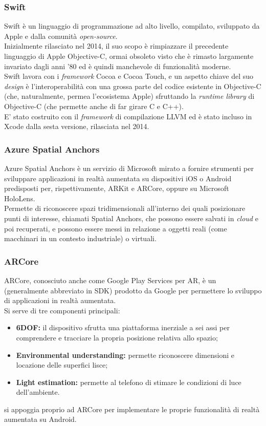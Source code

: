 \subsubsection{Swift}
Swift è un linguaggio di programmazione ad alto livello, compilato, sviluppato da Apple e dalla comunità \textit{open-source}.\\
Inizialmente rilasciato nel 2014, il suo scopo è rimpiazzare il precedente linguaggio di Apple Objective-C, ormai obsoleto visto che è rimasto largamente invariato dagli anni '80 ed è quindi manchevole di funzionalità moderne.\\
Swift lavora con i \textit{framework} Cocoa e Cocoa Touch, e un aspetto chiave del suo \textit{design} è l'interoperabilità con una grossa parte del codice esistente in Objective-C (che, naturalmente, permea l'ecosistema Apple) sfruttando la \textit{runtime library} di Objective-C (che permette anche di far girare C e C++).\\
E' stato costruito con il \textit{framework} di compilazione LLVM ed è stato incluso in Xcode dalla sesta versione, rilasciata nel 2014.

\subsubsection{Azure Spatial Anchors}
Azure Spatial Anchors è un servizio di Microsoft mirato a fornire strumenti per sviluppare applicazioni in realtà aumentata su dispositivi iOS o Android predisposti per, rispettivamente, ARKit e ARCore, oppure su Microsoft HoloLens.\\
Permette di riconoscere spazi tridimensionali all'interno dei quali posizionare punti di interesse, chiamati Spatial Anchors, che possono essere salvati in \textit{cloud} e poi recuperati, e possono essere messi in relazione a oggetti reali (come macchinari in un contesto industriale) o virtuali.

\subsubsection{ARCore}
ARCore, conosciuto anche come Google Play Services per AR, è un \sdk{} (generalmente abbreviato in SDK) prodotto da Google per permettere lo sviluppo di applicazioni in realtà aumentata.\\
Si serve di tre componenti principali:
\begin{itemize}
    \item \textbf{6DOF:} il dispositivo sfrutta una piattaforma inerziale a sei assi per comprendere e tracciare la propria posizione relativa allo spazio;
    \item \textbf{Environmental understanding:} permette riconoscere dimensioni e locazione delle superfici lisce;
    \item \textbf{Light estimation:} permette al telefono di stimare le condizioni di luce dell'ambiente.
\end{itemize}
\asa{} si appoggia proprio ad ARCore per implementare le proprie funzionalità di realtà aumentata su Android.

